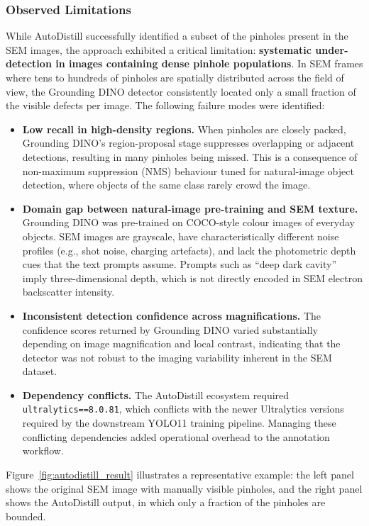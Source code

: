 \documentclass[pdflatex,sn-mathphys-num,iicol]{sn-jnl}
\theoremstyle{thmstyleone}
\theoremstyle{thmstyletwo}
\theoremstyle{thmstylethree}
\begin{document}
\subsubsection{Observed Limitations}
\label{subsubsec:autodistill_limitations}

While AutoDistill successfully identified a subset of the pinholes
present in the SEM images, the approach exhibited a critical
limitation: \textbf{systematic under-detection in images containing
dense pinhole populations}. In SEM frames where tens to hundreds of
pinholes are spatially distributed across the field of view, the
Grounding DINO detector consistently located only a small fraction of
the visible defects per image. The following failure modes were
identified:

\begin{itemize}
\item \textbf{Low recall in high-density regions.} When pinholes are
  closely packed, Grounding DINO's region-proposal stage suppresses
  overlapping or adjacent detections, resulting in many pinholes being
  missed. This is a consequence of non-maximum suppression (NMS)
  behaviour tuned for natural-image object detection, where objects of
  the same class rarely crowd the image.
\item \textbf{Domain gap between natural-image pre-training and SEM
  texture.} Grounding DINO was pre-trained on COCO-style colour images
  of everyday objects. SEM images are grayscale, have
  characteristically different noise profiles (e.g., shot noise,
  charging artefacts), and lack the photometric depth cues that the
  text prompts assume. Prompts such as ``deep dark cavity'' imply
  three-dimensional depth, which is not directly encoded in SEM
  electron backscatter intensity.
\item \textbf{Inconsistent detection confidence across magnifications.}
  The confidence scores returned by Grounding DINO varied substantially
  depending on image magnification and local contrast, indicating that
  the detector was not robust to the imaging variability inherent in
  the SEM dataset.
\item \textbf{Dependency conflicts.} The AutoDistill ecosystem required
  \texttt{ultralytics==8.0.81}, which conflicts with the newer
  Ultralytics versions required by the downstream YOLO11 training
  pipeline. Managing these conflicting dependencies added operational
  overhead to the annotation workflow.
\end{itemize}

Figure~\ref{fig:autodistill_result} illustrates a representative
example: the left panel shows the original SEM image with manually
visible pinholes, and the right panel shows the AutoDistill output,
in which only a fraction of the pinholes are bounded.
\end{document}
